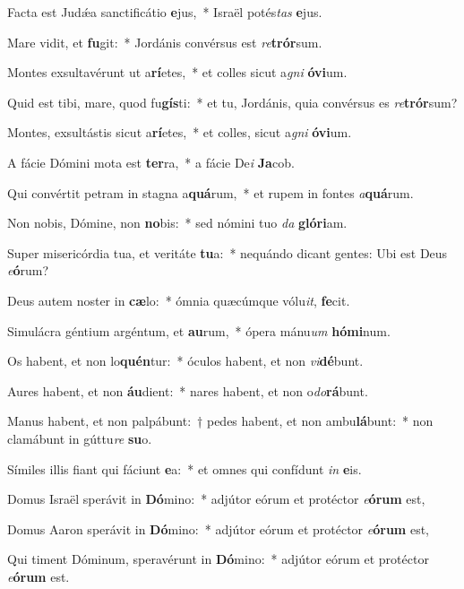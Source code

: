 \item Facta est Judǽa sanctificátio \textbf{e}jus,~* Israël potés\textit{tas} \textbf{e}jus.
\item Mare vidit, et \textbf{fu}git:~* Jordánis convérsus est \textit{re}\textbf{trór}sum.
\item Montes exsultavérunt ut a\textbf{rí}etes,~* et colles sicut a\textit{gni} \textbf{ó}\textbf{vi}um.
\item Quid est tibi, mare, quod fu\textbf{gís}ti:~* et tu, Jordánis, quia convérsus es \textit{re}\textbf{trór}sum?
\item Montes, exsultástis sicut a\textbf{rí}etes,~* et colles, sicut a\textit{gni} \textbf{ó}\textbf{vi}um.
\item A fácie Dómini mota est \textbf{ter}ra,~* a fácie De\textit{i} \textbf{Ja}cob.
\item Qui convértit petram in stagna a\textbf{quá}rum,~* et rupem in fontes \textit{a}\textbf{quá}rum.
\item Non nobis, Dómine, non \textbf{no}bis:~* sed nómini tuo \textit{da} \textbf{gló}\textbf{ri}am.
\item Super misericórdia tua, et veritáte \textbf{tu}a:~* nequándo dicant gentes: Ubi est Deus \textit{e}\textbf{ó}rum?
\item Deus autem noster in \textbf{cæ}lo:~* ómnia quæcúmque vólu\textit{it}, \textbf{fe}cit.
\item Simulácra géntium argéntum, et \textbf{au}rum,~* ópera mánu\textit{um} \textbf{hó}\textbf{mi}num.
\item Os habent, et non lo\textbf{quén}tur:~* óculos habent, et non \textit{vi}\textbf{dé}bunt.
\item Aures habent, et non \textbf{áu}dient:~* nares habent, et non o\textit{do}\textbf{rá}bunt.
\item Manus habent, et non palpábunt:~† pedes habent, et non ambu\textbf{lá}bunt:~* non clamábunt in gúttu\textit{re} \textbf{su}o.
\item Símiles illis fiant qui fáciunt \textbf{e}a:~* et omnes qui confídunt \textit{in} \textbf{e}is.
\item Domus Israël sperávit in \textbf{Dó}mino:~* adjútor eórum et protéctor \textit{e}\textbf{ó}\textbf{rum} est,
\item Domus Aaron sperávit in \textbf{Dó}mino:~* adjútor eórum et protéctor \textit{e}\textbf{ó}\textbf{rum} est,
\item Qui timent Dóminum, speravérunt in \textbf{Dó}mino:~* adjútor eórum et protéctor \textit{e}\textbf{ó}\textbf{rum} est.
